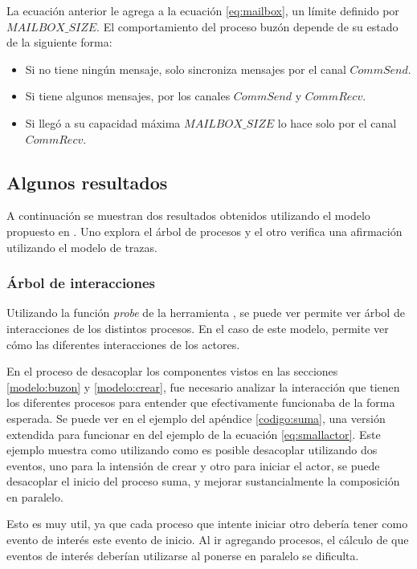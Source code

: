 La ecuación anterior le agrega a la ecuación \ref{eq:mailbox}, un límite definido por $MAILBOX\_SIZE$. El comportamiento del proceso buzón depende de su estado de la siguiente forma:

\begin{itemize}
\item Si no tiene ningún mensaje, solo sincroniza mensajes por el canal $CommSend$.
\item Si tiene algunos mensajes, por los canales $CommSend$ y $CommRecv$.
\item Si llegó a su capacidad máxima $MAILBOX\_SIZE$ lo hace solo por el canal $CommRecv$.
\end{itemize}

\subsection{Algunos resultados}

A continuación se muestran dos resultados obtenidos utilizando el modelo propuesto en \CSPm. Uno explora el árbol de procesos y el otro verifica una afirmación utilizando el modelo de trazas.

\subsubsection*{Árbol de interacciones}

Utilizando la función \textit{probe} de la herramienta \FDR, se puede ver permite ver árbol de interacciones de los distintos procesos. En el caso de este modelo, permite ver cómo las diferentes interacciones de los actores.

En el proceso de desacoplar los componentes vistos en las secciones \ref{modelo:buzon} y \ref{modelo:crear}, fue necesario analizar la interacción que tienen los diferentes procesos para entender que efectivamente funcionaba de la forma esperada. Se puede ver en el ejemplo del apéndice \ref{codigo:suma}, una versión extendida para funcionar en \FDR del ejemplo de la ecuación \ref{eq:smallactor}. Este ejemplo muestra como utilizando como es posible desacoplar utilizando dos eventos, uno para la intensión de crear y otro para iniciar el actor, se puede desacoplar el inicio del proceso suma, y mejorar sustancialmente la composición en paralelo. 

Esto es muy util, ya que cada proceso que intente iniciar otro debería tener como evento de interés este evento de inicio. Al ir agregando procesos, el cálculo de que eventos de interés deberían utilizarse al ponerse en paralelo se dificulta. 

